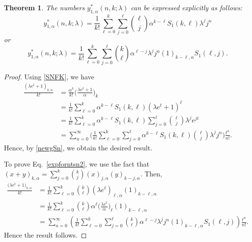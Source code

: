\documentclass[10pt,a4paper]{amsart}
\newtheorem{theorem}{Theorem}
\begin{document}
\begin{theorem}\label{thm:formntdSn}
The numbers $y_{1, \alpha}^{*}(n,k;\lambda)$ can be expressed explicitly  as follows:
 \begin{equation}\label{expforntsn}
 y_{1,\alpha}^{*}(n,k;\lambda)=\frac{1}{k!}\sum_{\ell=0}^{k}\sum_{j=0}^{\ell}\binom{\ell}{j}\alpha^{k-\ell}S_{1}(k,\ell)\lambda^{j}j^{n}
    \end{equation}
or
\begin{equation}\label{expforntsn2}
y_{1, \alpha}^{*}(n,k;\lambda)=\frac{1}{k!}\sum_{\ell=0}^{k}\sum_{j=0}^{\ell}\binom{k}{\ell}\alpha^{\ell-j}\lambda^{j}j^{n}(1)_{k-\ell, \alpha}S_{1}(\ell,j).
\end{equation}
\end{theorem}

\begin{proof}
Using \eqref{SNFK}, we have 
\begin{align*}
\frac{(\lambda e^t+1)_{k,\alpha}}{k!}&=\frac{\alpha^{k}}{k!}\Big(\frac{\lambda e^t+1}{\alpha}\Big)_{k}\\
&=\frac{1}{k!}\sum_{\ell=0}^{k}\alpha^{k-\ell}S_{1}(k,\ell)(\lambda e^t+1)^{\ell}\\
&=\frac{1}{k!}\sum_{\ell=0}^{k}\alpha^{k-\ell}S_{1}(k,\ell)\sum_{j=0}^{\ell}\binom{\ell}{j}\lambda^{j}e^{jt}\\
&=\sum_{n=0}^{\infty}\Bigg(\frac{1}{k!}\sum_{\ell=0}^{k}\sum_{j=0}^{\ell}\alpha^{k-\ell}S_{1}(k,\ell)\binom{\ell}{j}\lambda^{j}j^n\Bigg)\frac{t^n}{n!}.
\end{align*}
Hence, by \eqref{newgSn}, we obtain the desired result.

To prove Eq.~\eqref{expforntsn2}, we use the fact that $(x+y)_{k, \alpha}=\sum\limits_{j=0}^{k}\binom{k}{j}(x)_{j,\alpha}(y)_{k-j, \alpha}$. Then,
\begin{align*}
\frac{\big(\lambda e^t+1\big)_{k, \alpha}}{k!}&=\frac{1}{k!}\sum_{\ell=0}^{k}\binom{k}{\ell}(\lambda e^t)_{\ell, \alpha}(1)_{k-\ell, \alpha}\\
&=\frac{1}{k!}\sum_{\ell=0}^{k}\binom{k}{\ell}\alpha^{\ell}\Big(\frac{\lambda e^t}{\alpha}\Big)_{\ell}(1)_{k-\ell, \alpha}\\
&=\sum_{n=0}^{\infty}\left(\frac{1}{k!}\sum_{\ell=0}^{k}\sum_{j=0}^{\ell}\binom{k}{\ell}\alpha^{\ell-j}\lambda^{j}j^{n}(1)_{k-\ell, \alpha}S_{1}(\ell,j)\right)\frac{t^n}{n!}.
\end{align*}
Hence the result follows.
\end{proof}
\end{document}
